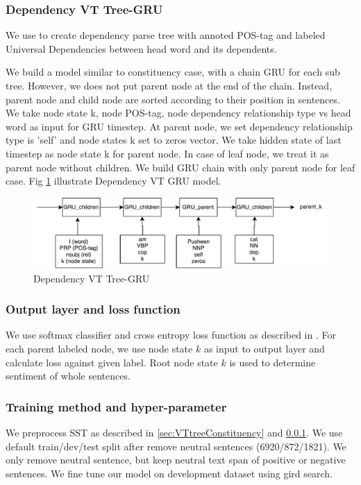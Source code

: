 \subsubsection{Dependency VT Tree-GRU} \label{sec:VTtreeDependency}
We use \cite{manning2014stanford} to create dependency parse tree with annoted POS-tag and labeled Universal Dependencies between head word and its dependents.

We build a model similar to constituency case, with a chain GRU for each sub tree. However, we does not put parent node at the end of the chain. Instead, parent node and child node are sorted according to their position in sentences. We take node state k, node POS-tag, node dependency relationship type vs head word as input for GRU timestep. At parent node, we set dependency relationship type is 'self' and node states k set to zeros vector. We take hidden state of last timestep as node state k for parent node. In case of leaf node, we treat it as parent node without children. We build GRU chain with only parent node for leaf case. Fig \ref{fig:dependencyvtgru} illustrate Dependency VT GRU model.

\begin{figure}[H]
	\centering
	\includegraphics[width=0.9\linewidth]{figure/dependencyvtgru}
	\caption[Dependency VT Tree-GRU]{Dependency VT Tree-GRU}
	\label{fig:dependencyvtgru}
\end{figure}

\subsubsection{Output layer and loss function}
We use softmax classifier and cross entropy loss function as described in \cite{treeLSTM}.  For each parent labeled node, we use node state $k$ as input to output layer and calculate loss against given label. Root node state $k$ is used to determine sentiment of whole sentences.

\subsubsection{Training method and hyper-parameter}
We preprocess SST as described in \ref{sec:VTtreeConstituency} and \ref{sec:VTtreeDependency}. We use default train/dev/test split after remove neutral sentences (6920/872/1821). We only remove neutral sentence, but keep neutral text span of positive or negative sentences. We fine tune our model on development dataset using gird search.

